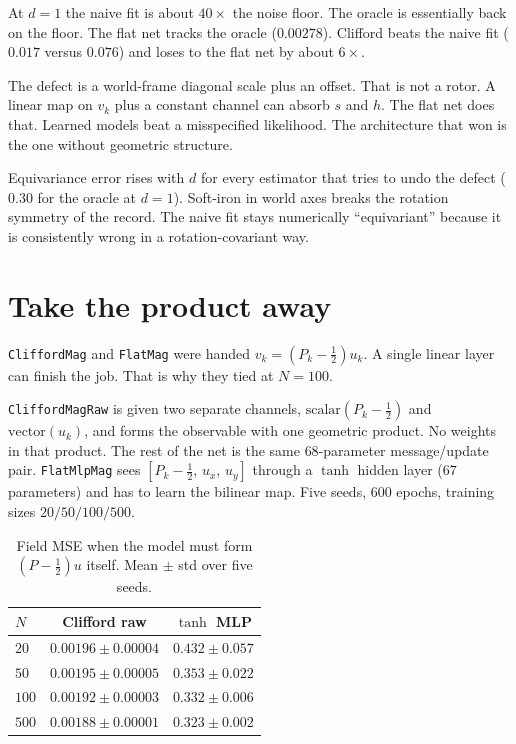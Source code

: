 \documentclass[11pt]{article}
\begin{document}
At $d=1$ the naive fit is about $40\times$ the noise floor.
The oracle is essentially back on the floor.
The flat net tracks the oracle ($0.00278$).
Clifford beats the naive fit ($0.017$ versus $0.076$) and loses to the flat net by about $6\times$.

The defect is a world-frame diagonal scale plus an offset.
That is not a rotor.
A linear map on $v_k$ plus a constant channel can absorb $s$ and $h$.
The flat net does that.
Learned models beat a misspecified likelihood.
The architecture that won is the one without geometric structure.

Equivariance error rises with $d$ for every estimator that tries to undo the defect ($0.30$ for the oracle at $d=1$).
Soft-iron in world axes breaks the rotation symmetry of the record.
The naive fit stays numerically ``equivariant'' because it is consistently wrong in a rotation-covariant way.

\section{Take the product away}

\texttt{CliffordMag} and \texttt{FlatMag} were handed $v_k=(P_k-\tfrac12)u_k$.
A single linear layer can finish the job.
That is why they tied at $N=100$.

\texttt{CliffordMagRaw} is given two separate channels, $\mathrm{scalar}(P_k-\tfrac12)$ and $\mathrm{vector}(u_k)$, and forms the observable with one geometric product.
No weights in that product.
The rest of the net is the same $68$-parameter message/update pair.
\texttt{FlatMlpMag} sees $[P_k-\tfrac12,\,u_x,\,u_y]$ through a $\tanh$ hidden layer ($67$ parameters) and has to learn the bilinear map.
Five seeds, $600$ epochs, training sizes $20/50/100/500$.

\begin{table}[h]
\centering
\caption{Field MSE when the model must form $(P-\tfrac12)u$ itself. Mean $\pm$ std over five seeds.}
\label{tab:efficiency}
\begin{tabular}{lcc}
\toprule
$N$ & Clifford raw & $\tanh$ MLP \\
\midrule
$20$  & $0.00196\pm 0.00004$ & $0.432\pm 0.057$ \\
$50$  & $0.00195\pm 0.00005$ & $0.353\pm 0.022$ \\
$100$ & $0.00192\pm 0.00003$ & $0.332\pm 0.006$ \\
$500$ & $0.00188\pm 0.00001$ & $0.323\pm 0.002$ \\
\bottomrule
\end{tabular}
\end{table}
\end{document}
